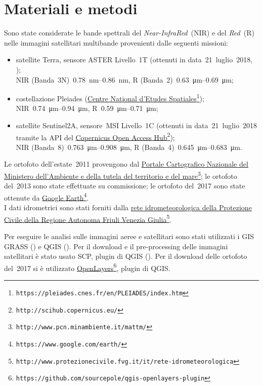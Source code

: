 \documentclass[12pt,a4paper]{article}
\begin{document}
\section{Materiali e metodi}
Sono state considerate le bande spettrali del \emph{Near-InfraRed}~(NIR) e del \emph{Red}~(R) nelle immagini satellitari multibande provenienti dalle seguenti missioni:
%
\begin{itemize}
	\item satellite Terra, sensore ASTER Livello~1T (ottenuti in data~21~luglio~2018, \cite{data:ASTER});  
		\\
		NIR (Banda~3N)~\SIrange[range-phrase={-}]{0.78}{0.86}{\nano\m}, R (Banda~2)~\SIrange[range-phrase={-}]{0.63}{0.69}{\micro\m};
	\item costellazione Pleiades (\href{https://pleiades.cnes.fr/en/PLEIADES/index.htm}{Centre National d'Etudes Spatiales}\footnote{\texttt{https://pleiades.cnes.fr/en/PLEIADES/index.htm}}); 
		\\
		NIR~\SIrange[range-phrase={-}]{0.74}{0.94}{\micro\m}, R~\SIrange[range-phrase={-}]{0.59}{0.71}{\micro\m};
	\item satellite Sentinel2A, sensore~MSI Livello~1C (ottenuti in data~21~luglio~2018 tramite la API del \href{http://scihub.copernicus.eu/}{Copernicus Open Access Hub}\footnote{\texttt{http://scihub.copernicus.eu/}});
		\\
		NIR (Banda~8)~\SIrange[range-phrase={-}]{0.763}{0.908}{\micro\m}, R (Banda~4)~\SIrange[range-phrase={-}]{0.645}{0.683}{\micro\m}.
\end{itemize}
%

Le ortofoto dell'estate~2011 provengono dal \href{http://www.pcn.minambiente.it/mattm/}{Portale Cartografico Nazionale del Ministero dell'Ambiente e della tutela del territorio e del mare}\footnote{\texttt{http://www.pcn.minambiente.it/mattm/}};
le ortofoto del~2013 sono state effettuate su commissione; 
%
%
le ortofoto del~2017 sono state ottenute da \href{https://www.google.com/earth/}{Google Earth}\footnote{\texttt{https://www.google.com/earth/}}.
\\
I dati idrometrici sono stati forniti dalla \href{http://www.protezionecivile.fvg.it/it/rete-idrometeorologica}{rete idrometeorologica della Protezione Civile della Regione Autonoma Friuli Venezia Giulia}\footnote{\texttt{http://www.protezionecivile.fvg.it/it/rete-idrometeorologica}}.


\medskip
Per eseguire le analisi sulle immagini aeree e satellitari sono stati utilizzati i GIS GRASS (\cite{soft:GRASS}) e QGIS (\cite{soft:QGIS}). Per il download e il pre-processing delle immagini satellitari è stato usato SCP, plugin di QGIS (\cite{soft:SCP}). Per il download delle ortofoto del~2017 si è utilizzato \href{https://github.com/sourcepole/qgis-openlayers-plugin}{OpenLayers}\footnote{\texttt{https://github.com/sourcepole/qgis-openlayers-plugin}}, plugin di QGIS.
\end{document}
